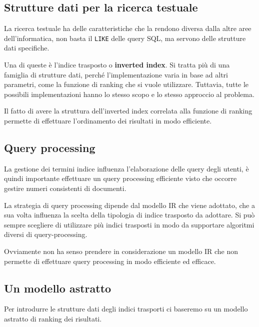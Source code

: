 


\subsection{Strutture dati per la ricerca testuale}

La ricerca testuale ha delle caratteristiche che la rendono diversa dalla altre aree dell'informatica, non basta il \texttt{LIKE} delle query SQL, ma servono delle strutture dati specifiche.

Una di queste è l'indice trasposto o \textbf{inverted index}. Si tratta più di una famiglia di strutture dati, perché l'implementazione varia in base ad altri parametri, come la funzione di ranking che si vuole utilizzare. Tuttavia, tutte le possibili implementazioni hanno lo stesso scopo e lo stesso approccio al problema.

Il fatto di avere la struttura dell'inverted index correlata alla funzione di ranking permette di effettuare l'ordinamento dei risultati in modo efficiente.

\subsection{Query processing}

La gestione dei termini indice influenza l'elaborazione delle query degli utenti, è quindi importante effettuare un query processing efficiente visto che occorre gestire numeri consistenti di documenti.

La strategia di query processing dipende dal modello IR che viene adottato, che a sua volta influenza la scelta della tipologia di indice trasposto da adottare. 
Si può sempre scegliere di utilizzare più indici trasposti in modo da supportare algoritmi diversi di query-processing.

Ovviamente non ha senso prendere in considerazione un modello IR che non permette di effettuare query processing in modo efficiente ed efficace.

\subsection{Un modello astratto}

Per introdurre le strutture dati degli indici trasporti ci baseremo su un modello astratto di ranking dei risultati.

